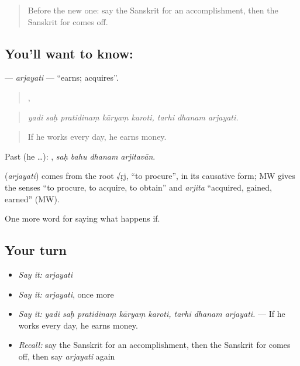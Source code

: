 \label{lesson:SA-C386-arjayati}



\begin{quote}
Before the new one: say the Sanskrit for an accomplishment, then the Sanskrit for comes off.
\end{quote}

\subsection*{You'll want to know: }
\textbf{} — \emph{arjayati} — \textquotedblleft{}earns; acquires\textquotedblright{}.

\begin{quote}
    ,   
\end{quote}

\begin{quote}
\emph{yadi saḥ pratidinaṃ kāryaṃ karoti, tarhi dhanam arjayati.}
\end{quote}

\begin{quote}
If he works every day, he earns money.
\end{quote}

Past (he …):    , \emph{saḥ bahu dhanam arjitavān}.

\begin{cousinweb}
\textbf{} (\emph{arjayati}) comes from the root √ṛj, \textquotedblleft{}to procure\textquotedblright{}, in its causative form; MW gives the senses \textquotedblleft{}to procure, to acquire, to obtain\textquotedblright{} and \emph{arjita} \textquotedblleft{}acquired, gained, earned\textquotedblright{} (MW).
\end{cousinweb}

\begin{grammarlens}[title={What you've built}]
One more word for saying what happens if.
\end{grammarlens}

\subsection*{Your turn}
\begin{itemize}
\raggedright
  \item \emph{Say it:} \emph{arjayati}
  \item \emph{Say it:} \emph{arjayati}, once more
  \item \emph{Say it:} \emph{yadi saḥ pratidinaṃ kāryaṃ karoti, tarhi dhanam arjayati.} — If he works every day, he earns money.
  \item \emph{Recall:} say the Sanskrit for an accomplishment, then the Sanskrit for comes off, then say \emph{arjayati} again
\end{itemize}

